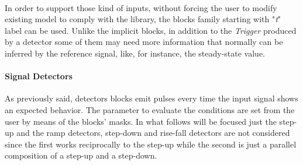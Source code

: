 \noindent
\\
In order to support those kind of inputs, without forcing the user to modify existing model to comply with the library, the blocks  family starting with "\textit{t}" label can be used. Unlike the implicit blocks, in addition to the \textit{Trigger} produced by a detector some of them may need more information that normally can be inferred by the reference signal, like, for instance, the steady-state value.

\paragraph{Signal Detectors} As previously said, detectors blocks emit pulses every time the input signal shows an expected behavior. The parameter to evaluate the conditions are set from the user by means of the blocks' masks. In what follows will be focused just the step-up and the ramp detectors, step-down and rise-fall detectors are not considered since the first works reciprocally to the step-up while the second is just a parallel composition of a step-up and a step-down. 
